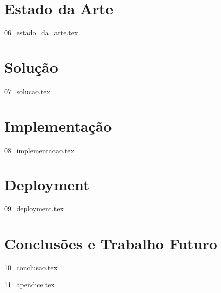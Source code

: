 \documentclass[
  oneside,
  12pt, a4paper,
  footinclude=true,
  headinclude=true,
  cleardoublepage=empty
]{scrbook}
\begin{document}
	\chapter{Estado da Arte}
    {06_estado_da_arte.tex}

	\chapter{Solução}
    {07_solucao.tex}

	\chapter{Implementação}
    {08_implementacao.tex}

	\chapter{Deployment}
    {09_deployment.tex}
		
	\chapter{Conclusões e Trabalho Futuro}
    {10_conclusao.tex}
			

	

	
    {11_apendice.tex}

    \umbackcover{}
	
\end{document}
